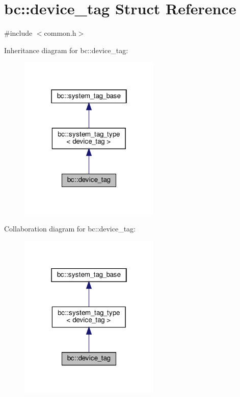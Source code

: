 \hypertarget{structbc_1_1device__tag}{}\section{bc\+:\+:device\+\_\+tag Struct Reference}
\label{structbc_1_1device__tag}


{\ttfamily \#include $<$common.\+h$>$}



Inheritance diagram for bc\+:\+:device\+\_\+tag\+:\nopagebreak
\begin{figure}[H]
\begin{center}
\leavevmode
\includegraphics[width=190pt]{structbc_1_1device__tag__inherit__graph}
\end{center}
\end{figure}


Collaboration diagram for bc\+:\+:device\+\_\+tag\+:\nopagebreak
\begin{figure}[H]
\begin{center}
\leavevmode
\includegraphics[width=190pt]{structbc_1_1device__tag__coll__graph}
\end{center}
\end{figure}
